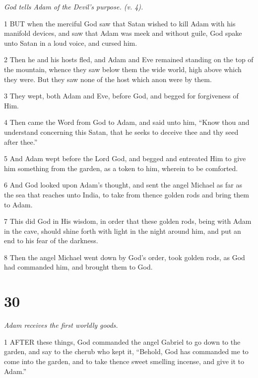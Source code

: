 \par \textit{God tells Adam of the Devil's purpose. (v. 4).}

\par 1 BUT when the merciful God saw that Satan wished to kill Adam with his manifold devices, and saw that Adam was meek and without guile, God spake unto Satan in a loud voice, and cursed him.

\par 2 Then he and his hosts fled, and Adam and Eve remained standing on the top of the mountain, whence they saw below them the wide world, high above which they were. But they saw none of the host which anon were by them.

\par 3 They wept, both Adam and Eve, before God, and begged for forgiveness of Him.

\par 4 Then came the Word from God to Adam, and said unto him, “Know thou and understand concerning this Satan, that he seeks to deceive thee and thy seed after thee.”

\par 5 And Adam wept before the Lord God, and begged and entreated Him to give him something from the garden, as a token to him, wherein to be comforted.

\par 6 And God looked upon Adam's thought, and sent the angel Michael as far as the sea that reaches unto India, to take from thence golden rods and bring them to Adam.

\par 7 This did God in His wisdom, in order that these golden rods, being with Adam in the cave, should shine forth with light in the night around him, and put an end to his fear of the darkness.

\par 8 Then the angel Michael went down by God's order, took golden rods, as God had commanded him, and brought them to God.

\chapter{30}

\par \textit{Adam receives the first worldly goods.}

\par 1 AFTER these things, God commanded the angel Gabriel to go down to the garden, and say to the cherub who kept it, “Behold, God has commanded me to come into the garden, and to take thence sweet smelling incense, and give it to Adam.”

